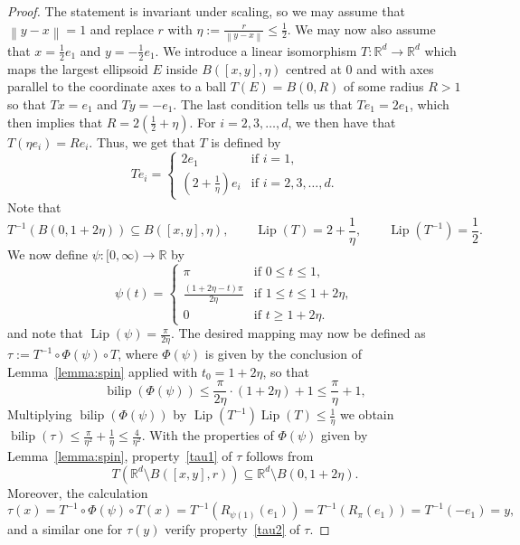 \documentclass[a4paper, bibliography=totoc]{scrartcl}
\numberwithin{claimcounter}{define}
\newcommand{\R}{\mathbb{R}}
\newcommand{\lip}{\operatorname{Lip}}
\newcommand{\bilip}{\operatorname{bilip}}
\newcommand{\enorm}[1]{\left\|#1\right\|}
\newcommand{\br}[1]{\left(#1\right)}
\begin{document}
\restatespin
\begin{proof}
	The statement is invariant under scaling, so we may assume that $\enorm{y-x}=1$ and replace $r$ with $\eta:=\frac{r}{\enorm{y-x}}\leq\frac{1}{2}$. We may now also assume that $x=\frac{1}{2}e_{1}$ and $y=-\frac{1}{2}e_{1}$. We introduce a linear isomorphism $T\colon \R^{d}\to\R^{d}$ which maps the largest ellipsoid $E$ inside $B([x,y],\eta)$ centred at $0$ and with axes parallel to the coordinate axes to a ball $T(E)=B(0,R)$ of some radius $R>1$ so that $Tx=e_{1}$ and $Ty=-e_{1}$. The last condition tells us that $Te_{1}=2e_{1}$, which then implies that $R=2 \br{\frac{1}{2}+\eta}$. For $i=2,3,\ldots,d$, we then have that $T(\eta e_{i})=Re_{i}$. Thus, we get that $T$ is defined by
	\begin{equation*}
	Te_{i}=\begin{cases}
	2e_{1} & \text{if }i=1,\\
	\br{2+\frac{1}{\eta}} e_{i} & \text{if }i=2,3,\ldots,d.
	\end{cases}
	\end{equation*}
	Note that
	\begin{equation*}
	T^{-1}\br{B\br{0,1+2\eta}}\subseteq B([x,y],\eta), \qquad
	\lip(T)=2+\frac{1}{\eta},
	\qquad \lip(T^{-1})=\frac{1}{2}.
	\end{equation*}
	We now define $\psi\colon [0,\infty)\to \R$ by
	\begin{equation*}
	\psi(t)=\begin{cases}
	\pi & \text{if }0\leq t\leq 1,\\
	\frac{\br{1+2\eta-t}\pi}{2\eta} & \text{if }1\leq t\leq 1+2\eta,\\
	0 & \text{if }t\geq 1+2\eta.
	\end{cases}
	\end{equation*}
	and note that $\lip(\psi)=\frac{\pi}{2\eta}$. The desired mapping may now be defined as $\tau:=T^{-1}\circ \Phi(\psi)\circ T$, where $\Phi(\psi)$ is given by the conclusion of Lemma~\ref{lemma:spin} applied with $t_{0}=1+2\eta$, so that
	\begin{equation*}
	\bilip\br{\Phi(\psi)}\leq \frac{\pi}{2\eta}\cdot \br{1+2\eta}+1\leq \frac{\pi}{\eta}+1,
	\end{equation*}
	Multiplying $\bilip\br{\Phi(\psi)}$ by $\lip(T^{-1})\lip(T)\leq \frac{1}{\eta}$ we obtain $\bilip(\tau)\leq\frac{\pi}{\eta^{2}}+\frac{1}{\eta}\leq \frac{4}{\eta^{2}}$. With the properties of $\Phi(\psi)$ given by Lemma~\ref{lemma:spin}, property~\eqref{tau1} of $\tau$ follows from \[T\br{\R^{d}\setminus B([x,y],r)}\subseteq \R^{d}\setminus B(0,1+2\eta).\] Moreover, the calculation
	\begin{equation*}
	\tau(x)=T^{-1}\circ \Phi(\psi)\circ T(x)=T^{-1}\br{ R_{\psi(1)}(e_{1})}=T^{-1}\br{R_{\pi}(e_{1})}=T^{-1}(-e_{1})=y,
	\end{equation*}
	and a similar  one for $\tau(y)$ verify property~\eqref{tau2} of $\tau$.
\end{proof}
\end{document}
